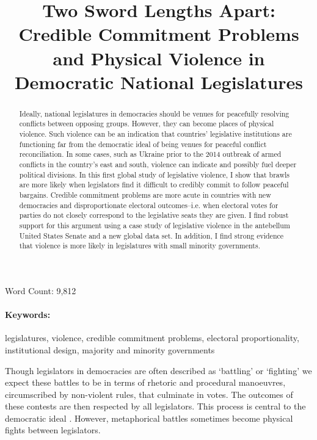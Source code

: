 \documentclass[a4paper]{article}\usepackage[]{graphicx}\usepackage[]{color}
\title{Two Sword Lengths Apart: Credible Commitment Problems and Physical Violence in Democratic National Legislatures}
\begin{document}
\maketitle

\begin{center}
Word Count: 9,812
\end{center}

\begin{abstract}
Ideally, national legislatures in democracies should be venues for peacefully resolving conflicts between opposing groups. However, they can become places of physical violence. Such violence can be an indication that countries' legislative institutions are functioning far from the democratic ideal of being venues for peaceful conflict reconciliation. In some cases, such as Ukraine prior to the 2014 outbreak of armed conflicts in the country's east and south, violence can indicate and possibly fuel deeper political divisions. In this first global study of legislative violence, I show that brawls are more likely when legislators find it difficult to credibly commit to follow peaceful bargains. Credible commitment problems are more acute in countries with new democracies and disproportionate electoral outcomes--i.e. when electoral votes for parties do not closely correspond to the legislative seats they are given. I find robust support for this argument using a case study of legislative violence in the antebellum United States Senate and a new global data set. In addition, I find strong evidence that violence is more likely in legislatures with small minority governments.
\end{abstract}


\paragraph{Keywords:} legislatures, violence, credible commitment problems, electoral proportionality, institutional design, majority and minority governments

\vspace{0.3cm}


Though legislators in democracies are often described as `battling' or `fighting' we expect these battles to be in terms of rhetoric and procedural manoeuvres, circumscribed by non-violent rules, that culminate in votes. The outcomes of these contests are then respected by all legislators. This process is central to the democratic ideal  \cite[220]{Schwarzmantel2010}. However, metaphorical battles sometimes become physical fights between legislators.
\end{document}
